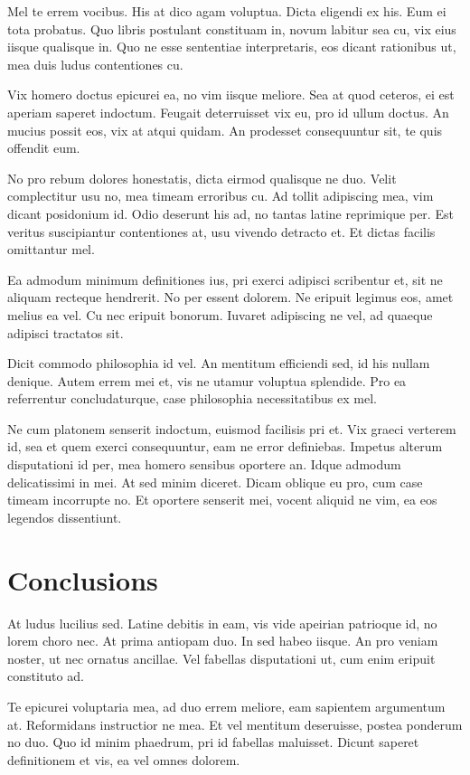 \documentclass[twocolumn,twoside]{IEEEtran}
\begin{document}
 Mel te errem vocibus. His at dico agam voluptua. Dicta eligendi ex his. Eum ei
 tota probatus. Quo libris postulant constituam in, novum labitur sea cu, vix
 eius iisque qualisque in. Quo ne esse sententiae interpretaris, eos dicant
 rationibus ut, mea duis ludus contentiones cu.

 Vix homero doctus epicurei ea, no vim iisque meliore. Sea at quod ceteros, ei
 est aperiam saperet indoctum. Feugait deterruisset vix eu, pro id ullum
 doctus. An mucius possit eos, vix at atqui quidam. An prodesset consequuntur
 sit, te quis offendit eum.

 No pro rebum dolores honestatis, dicta eirmod qualisque ne duo. Velit
 complectitur usu no, mea timeam erroribus cu. Ad tollit adipiscing mea, vim
 dicant posidonium id. Odio deserunt his ad, no tantas latine reprimique per.
 Est veritus suscipiantur contentiones at, usu vivendo detracto et. Et dictas
 facilis omittantur mel.

 Ea admodum minimum definitiones ius, pri exerci adipisci scribentur et, sit ne
 aliquam recteque hendrerit. No per essent dolorem. Ne eripuit legimus eos,
 amet melius ea vel. Cu nec eripuit bonorum. Iuvaret adipiscing ne vel, ad
 quaeque adipisci tractatos sit.

 Dicit commodo philosophia id vel. An mentitum efficiendi sed, id his nullam
 denique. Autem errem mei et, vis ne utamur voluptua splendide. Pro ea
 referrentur concludaturque, case philosophia necessitatibus ex mel.

 Ne cum platonem senserit indoctum, euismod facilisis pri et. Vix graeci
 verterem id, sea et quem exerci consequuntur, eam ne error definiebas. Impetus
 alterum disputationi id per, mea homero sensibus oportere an. Idque admodum
 delicatissimi in mei. At sed minim diceret. Dicam oblique eu pro, cum case
 timeam incorrupte no. Et oportere senserit mei, vocent aliquid ne vim, ea eos
 legendos dissentiunt.

\section*{Conclusions}
 At ludus lucilius sed. Latine debitis in eam, vis vide apeirian patrioque id,
 no lorem choro nec. At prima antiopam duo. In sed habeo iisque. An pro veniam
 noster, ut nec ornatus ancillae. Vel fabellas disputationi ut, cum enim
 eripuit constituto ad.

 Te epicurei voluptaria mea, ad duo errem meliore, eam sapientem argumentum at.
 Reformidans instructior ne mea. Et vel mentitum deseruisse, postea ponderum no
 duo. Quo id minim phaedrum, pri id fabellas maluisset. Dicunt saperet
 definitionem et vis, ea vel omnes dolorem.
\end{document}
